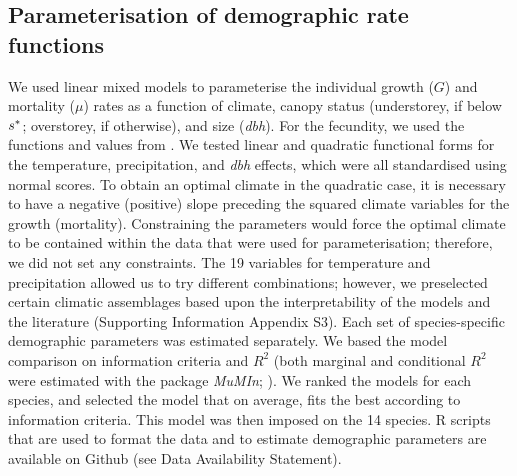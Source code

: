 \subsection{Parameterisation of demographic rate functions}
We used linear mixed models to parameterise the individual growth ($ G $) and mortality ($ \mu $) rates as a function of climate, canopy status (understorey, if below $ {s}^{*} $; overstorey, if otherwise), and size (\textit{dbh}). For the fecundity, we used the functions and values from \citet{Purves2008}. We tested linear and quadratic functional forms for the temperature, precipitation, and \textit{dbh} effects, which were all standardised using normal scores. To obtain an optimal climate in the quadratic case, it is necessary to have a negative (positive) slope preceding the squared climate variables for the growth (mortality). Constraining the parameters would force the optimal climate to be contained within the data that were used for parameterisation; therefore, we did not set any constraints. The 19 variables for temperature and precipitation allowed us to try different combinations; however, we preselected certain climatic assemblages based upon the interpretability of the models and the literature (Supporting Information Appendix S3). Each set of species-specific demographic parameters was estimated separately. We based the model comparison on information criteria and $ R^2 $ (both marginal and conditional $ R^2 $ were estimated with the package \textit{MuMIn}; \citet{MuMIn}). We ranked the models for each species, and selected the model that on average, fits the best according to information criteria. This model was then imposed on the 14 species. R scripts that are used to format the data and to estimate demographic parameters are available on Github (see Data Availability Statement). 

